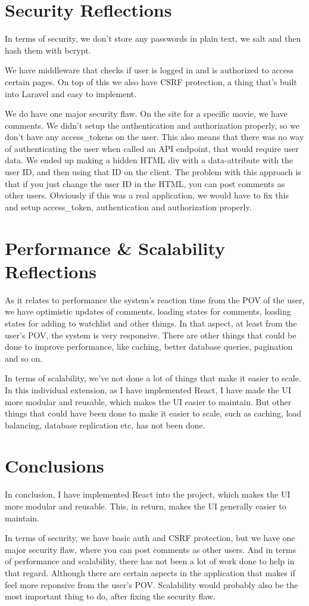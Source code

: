 \documentclass[letterpaper,twocolumn]{article}
\begin{document}
\section{Security Reflections}

In terms of security, we don't store any passwords in plain text, we salt and then hash them with bcrypt.

We have middleware that checks if user is logged in and is authorized to access certain pages.
On top of this we also have CSRF protection, a thing that's built into Laravel and easy to implement.

We do have one major security flaw. On the site for a specific movie, we have comments. We didn't setup the authentication and authorization properly, so we don't have any access\_tokens on the user.
This also means that there was no way of authenticating the user when called an API endpoint, that would require user data.
We ended up making a hidden HTML div with a data-attribute with the user ID, and then using that ID on the client.
The problem with this approach is that if you just change the user ID in the HTML, you can post comments as other users.
Obviously if this was a real application, we would have to fix this and setup access\_token, authentication and authorization properly.


\section{Performance \& Scalability Reflections}

As it relates to performance the system's reaction time from the POV of the user, we have optimistic updates of comments, loading states for comments, loading states for adding to watchlist and other things.
In that aspect, at least from the user's POV, the system is very responsive.
There are other things that could be done to improve performance, like caching, better database queries, pagination and so on.

In terms of scalability, we've not done a lot of things that make it easier to scale.
In this individual extension, as I have implemented React, I have made the UI more modular and reusable, which makes the UI easier to maintain.
But other things that could have been done to make it easier to scale, such as caching, load balancing, database replication etc, has not been done.


\section{Conclusions}

In conclusion, I have implemented React into the project, which makes the UI more modular and reusable.
This, in return, makes the UI generally easier to maintain.

In terms of security, we have basic auth and CSRF protection, but we have one major security flaw, where you can post comments as other users.
And in terms of performance and scalability, there has not been a lot of work done to help in that regard.
Although there are certain aspects in the application that makes if feel more reponsive from the user's POV.
Scalability would probably also be the most important thing to do, after fixing the security flaw.
\end{document}
